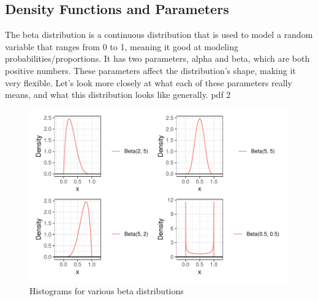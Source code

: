 \documentclass{article}\usepackage[]{graphicx}\usepackage[]{xcolor}
\begin{document}
\begin{multicols}{2}
\section{Density Functions and Parameters}
The beta distribution is a continuous distribution that is used to model a random variable that ranges from 0 to 1, meaning it good at modeling probabilities/proportions. It has two parameters, alpha and beta, which are both positive numbers. These parameters affect the distribution's shape, making it very flexible. Let's look more closely at what each of these parameters really means, and what this distribution looks like generally.
pdf 
  2 

\begin{figure} [H]
\centering
\includegraphics[width=\linewidth]{beta.plots.pdf}
\caption{Histograms for various beta distributions}
\label{fig:beta}
\end{figure}

\begin{table}[H]
\centering
{}
\caption{Numerical summaries of beta distributions} 
\label{beta.plots:reference}
\end{table}


\end{multicols}
\end{document}
